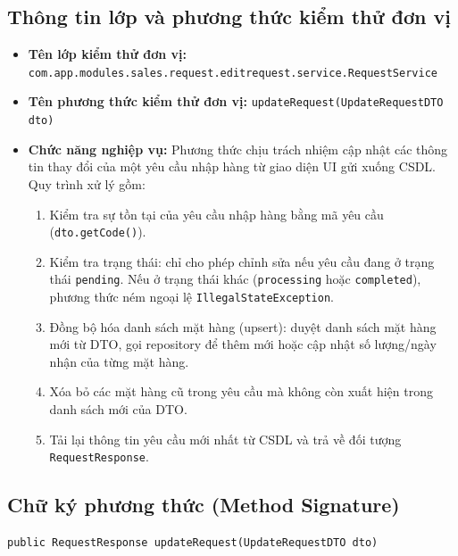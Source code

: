 \documentclass[12pt,a4paper]{article}
\begin{document}
\subsection{Thông tin lớp và phương thức kiểm thử đơn vị}
\begin{itemize}[leftmargin=*]
  \item \textbf{Tên lớp kiểm thử đơn vị:} \texttt{com.app.modules.sales.request.editrequest.service.RequestService}
  \item \textbf{Tên phương thức kiểm thử đơn vị:} \texttt{updateRequest(UpdateRequestDTO dto)}
  \item \textbf{Chức năng nghiệp vụ:} Phương thức chịu trách nhiệm cập nhật các thông tin thay đổi của một yêu cầu nhập hàng từ giao diện UI gửi xuống CSDL. Quy trình xử lý gồm:
  \begin{enumerate}[leftmargin=*]
    \item Kiểm tra sự tồn tại của yêu cầu nhập hàng bằng mã yêu cầu (\texttt{dto.getCode()}).
    \item Kiểm tra trạng thái: chỉ cho phép chỉnh sửa nếu yêu cầu đang ở trạng thái \texttt{pending}. Nếu ở trạng thái khác (\texttt{processing} hoặc \texttt{completed}), phương thức ném ngoại lệ \texttt{IllegalStateException}.
    \item Đồng bộ hóa danh sách mặt hàng (upsert): duyệt danh sách mặt hàng mới từ DTO, gọi repository để thêm mới hoặc cập nhật số lượng/ngày nhận của từng mặt hàng.
    \item Xóa bỏ các mặt hàng cũ trong yêu cầu mà không còn xuất hiện trong danh sách mới của DTO.
    \item Tải lại thông tin yêu cầu mới nhất từ CSDL và trả về đối tượng \texttt{RequestResponse}.
  \end{enumerate}
\end{itemize}

\subsection{Chữ ký phương thức (Method Signature)}
\begin{lstlisting}
public RequestResponse updateRequest(UpdateRequestDTO dto)
\end{lstlisting}
\end{document}
